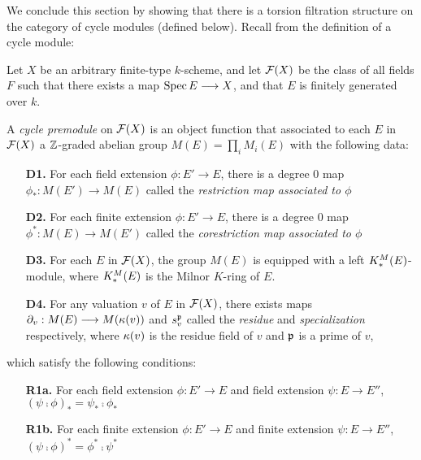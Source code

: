 We conclude this section by showing that there is a torsion 
filtration structure on the category of cycle modules (defined 
below). Recall from \cite{Rost96} the definition of a cycle 
module:

\begin{defn}\label{def_pre_cycmod}
Let $X$ be an arbitrary finite-type $k$-scheme, and let 
$\mathcal{F}(X)$ be the class of all fields $F$ such that there
exists a map $\mathrm{Spec}\, E \longrightarrow X$, and that $E$ is finitely generated
over $k$.

A \emph{cycle premodule} on $\mathcal{F}(X)$ is an object function
that associated to each $E$ in $\mathcal{F}(X)$ a $\mathbb{Z}$-graded abelian
group $M(E) = \prod_i M_i(E)$ with the following data:

\begin{enumerate}
\item[\textbf{D1.}] For each field extension $\phi: E' \to E$, 
there is a degree 0 map $\phi_*: M(E') \to M(E)$ called the 
\emph{restriction map associated to $\phi$}

\item[\textbf{D2.}] For each finite extension $\phi: E' \to E$, 
there is a degree 0 map $\phi^*: M(E) \to M(E')$ called the 
\emph{corestriction map associated to $\phi$}

\item[\textbf{D3.}] For each $E$ in $\mathcal{F}(X)$, the group $M(E)$ 
is equipped with a left $K^M_*(E)$-module, where $K^M_*(E)$ is 
the Milnor $K$-ring of $E$.

\item[\textbf{D4.}] For any valuation $v$ of $E$ in $\mathcal{F}(X)$, 
there exists maps $\partial_{v}: M(E) \longrightarrow M(\kappa(v))$ and 
$s_{v}^{\mathfrak{p}}$ called the \emph{residue} and 
\emph{specialization} respectively, where $\kappa(v)$ is the 
residue field of $v$ and $\mathfrak{p}$ is a prime of $v$,
\end{enumerate}

which satisfy the following conditions:

\begin{enumerate}
\item[\textbf{R1a.}] For each field extension $\phi: E' \to E$ and 
field extension $\psi: E \to E''$, $(\psi \comp \phi)_* = \psi_* 
\comp \phi_*$

\item[\textbf{R1b.}] For each finite extension $\phi: E' \to E$ and 
finite extension $\psi: E \to E''$, $(\psi \comp \phi)^* = \phi^* 
\comp \psi^*$


\end{enumerate}
\end{defn}
